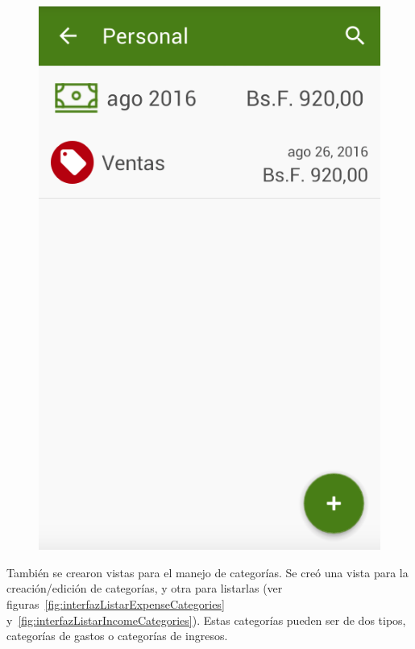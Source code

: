 \begin{figure}[ht]
\begin{minipage}{.5\textwidth}
  \includegraphics[scale=0.4,type=png,ext=.png,read=.png]{imagenes/incomes_list}
  \captionsetup{justification=centering}
  \label{fig:interfazListarIncomes}
\end{minipage}
\end{figure}

También se crearon vistas para el manejo de categorías. Se creó una vista para la creación/edición de categorías, y otra para listarlas (ver figuras~\ref{fig:interfazListarExpenseCategories} y~\ref{fig:interfazListarIncomeCategories}). Estas categorías pueden ser de dos tipos, categorías de gastos o categorías de ingresos.

